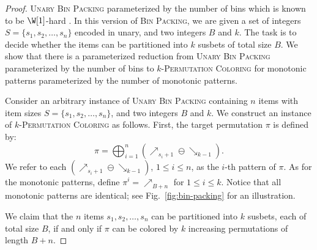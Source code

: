 \begin{proof}
  \textsc{Unary Bin Packing} parameterized by the number of bins which is
  known to be $\W[1]$-hard \cite{DBLP:journals/jcss/JansenKMS13}.
  In this version of \textsc{Bin Packing}, we are given a set of integers
  $S = \{s_1, s_2, \dots, s_n\}$
  encoded in unary, and two integers $B$ and $k$.
  The task is to decide whether the items can be partitioned into $k$ susbets of
  total size $B$.
  We show that there is a parameterized reduction from
  \textsc{Unary Bin Packing} parameterized by the number of bins to
  \textsc{$k$-Permutation Coloring} for monotonic patterns
  parameterized by the number of monotonic patterns.

  Consider an arbitrary instance of \textsc{Unary Bin Packing} containing
  $n$ items with item sizes $S = \{s_1, s_2, \dots, s_n\}$,
  and two integers $B$ and $k$.
  We construct an instance of \textsc{$k$-Permutation Coloring}
  as follows.
  First, the target permutation $\pi$ is defined by:
  $$
  \pi =
    \bigoplus_{i=1}^{n} \left(\mathbf{\nearrow}_{s_i+1} \ominus
                              \mathbf{\searrow}_{k-1}\right)
    \text{.}
  $$
  We refer to each
  $\left(\mathbf{\nearrow}_{s_i+1} \ominus \mathbf{\searrow}_{k-1}\right)$,
  $1 \leq i \leq n$,
  as the $i$-th pattern of $\pi$.
  As for the monotonic patterns,
  define $\pi^i = {\nearrow}_{B+n}$
  for $1 \leq i \leq k$.
  Notice that all monotonic patterns are identical;
  see Fig.~\ref{fig:bin-packing} for an illustration.

  

  We claim that the $n$ items $s_1, s_2, \dots, s_n$
  can be partitioned into $k$ susbets, each of total size $B$,
  if and only if
  $\pi$ can be colored by $k$ increasing permutations of length $B+n$.


\end{proof}
